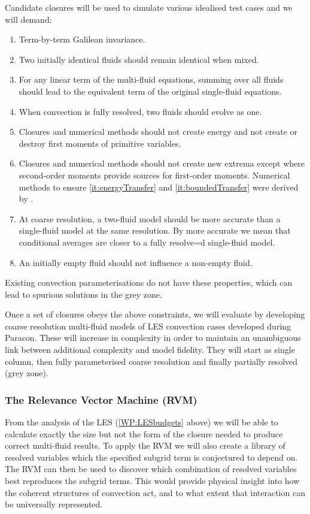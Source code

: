 \documentclass[11pt,a4paper]{article}
\begin{document}
Candidate closures will be used to simulate various idealised test cases and we will demand:
\begin{enumerate}
\item Term-by-term Galilean invariance.
\item Two initially identical fluids should remain identical when mixed.
\item For any linear term of the multi-fluid equations, summing over all fluids should lead to the equivalent term of the original single-fluid equations.
\item  When convection is fully resolved, two fluids should evolve as one.
\item\label{it:energyTransfer} Closures and numerical methods should not create energy and not create or destroy first moments of primitive variables.
\item\label{it:boundedTransfer} Closures and numerical methods should not create new extrema except where second-order moments provide sources for first-order moments.  Numerical methods to ensure \ref{it:energyTransfer} and \ref{it:boundedTransfer} were derived by \cite{MWH20}.
\item At coarse resolution, a two-fluid model should be more accurate than a single-fluid model at the same resolution. By more accurate we mean that conditional averages are closer to a fully resolve=d single-fluid model.
\item An initially empty fluid should not influence a non-empty fluid.
\end{enumerate}
Existing convection parameterisations do not have these properties, which can lead to spurious solutions in the grey zone.

Once a set of closures obeys the above constraints, we will evaluate by developing coarse resolution multi-fluid models of LES convection cases developed during Paracon. These will increase in complexity in order to maintain an unambiguous link between additional complexity and model fidelity. They will start as single column, then fully parameterised coarse resolution and finally partially resolved (grey zone). 

\subsubsection*{The Relevance Vector Machine (RVM)}

From the analysis of the LES (\ref{WP:LESbudgets} above) we will be able to calculate exactly the size but not the form of the closure needed to produce correct multi-fluid results. To apply the RVM we will also create a library of resolved variables which the specified subgrid term is conjectured to depend on. The RVM can then be used to discover which combination of resolved variables best reproduces the subgrid terms. This would provide physical insight into how the coherent structures of convection act, and to what extent that interaction can be universally represented.
\end{document}

